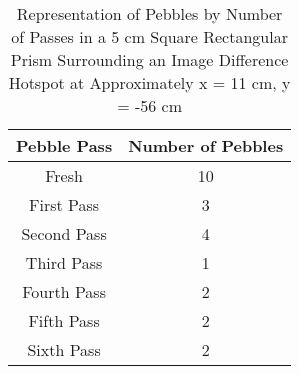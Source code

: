 
\begin{table}[H]
\centering
\caption{Representation of Pebbles by Number of Passes in a 5 cm Square Rectangular Prism Surrounding an Image Difference Hotspot at Approximately x = 11 cm, y = -56 cm}
 \begin{tabularx}{0.35\textwidth}{c  c}
 	\hline
 	Pebble Pass & Number of Pebbles \\
 	\hline
 	Fresh & 10\\
 	First Pass & 3 \\
 	Second Pass & 4 \\
 	Third Pass & 1 \\
 	Fourth Pass & 2 \\
 	Fifth Pass & 2 \\
 	Sixth Pass & 2 \\
 	\hline

 \end{tabularx}
\label{table:5cmpebb}
\end{table}